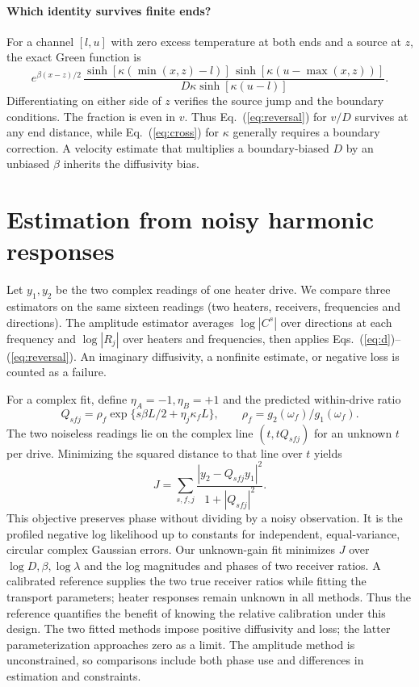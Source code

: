 \documentclass[11pt]{article}
\begin{document}
\paragraph{Which identity survives finite ends?}
For a channel $[l,u]$ with zero excess temperature at both ends and a source at $z$, the exact Green function is
\begin{equation}
 e^{\beta(x-z)/2}\,
 \frac{\sinh[\kappa(\min(x,z)-l)]\,\sinh[\kappa(u-\max(x,z))]}
 {D\kappa\sinh[\kappa(u-l)]}. \label{eq:finite}
\end{equation}
Differentiating on either side of $z$ verifies the source jump and the boundary conditions. The fraction is even in $v$. Thus Eq.~(\ref{eq:reversal}) for $v/D$ survives at any end distance, while Eq.~(\ref{eq:cross}) for $\kappa$ generally requires a boundary correction. A velocity estimate that multiplies a boundary-biased $D$ by an unbiased $\beta$ inherits the diffusivity bias.

\section{Estimation from noisy harmonic responses}
Let $y_1,y_2$ be the two complex readings of one heater drive. We compare three estimators on the same sixteen readings (two heaters, receivers, frequencies and directions). The amplitude estimator averages $\log |C^s|$ over directions at each frequency and $\log|R_j|$ over heaters and frequencies, then applies Eqs.~(\ref{eq:d})--(\ref{eq:reversal}). An imaginary diffusivity, a nonfinite estimate, or negative loss is counted as a failure.

For a complex fit, define $\eta_A=-1,\eta_B=+1$ and the predicted within-drive ratio
\[
 Q_{sfj}=\rho_f\exp\{s\beta L/2+\eta_j\kappa_f L\},\qquad \rho_f=g_2(\omega_f)/g_1(\omega_f).
\]
The two noiseless readings lie on the complex line $(t,tQ_{sfj})$ for an unknown $t$ per drive. Minimizing the squared distance to that line over $t$ yields
\begin{equation}
 J=\sum_{s,f,j}\frac{|y_2-Q_{sfj}y_1|^2}{1+|Q_{sfj}|^2}. \label{eq:profile}
\end{equation}
This objective preserves phase without dividing by a noisy observation. It is the profiled negative log likelihood up to constants for independent, equal-variance, circular complex Gaussian errors. Our unknown-gain fit minimizes $J$ over $\log D,\beta,\log\lambda$ and the log magnitudes and phases of two receiver ratios. A calibrated reference supplies the two true receiver ratios while fitting the transport parameters; heater responses remain unknown in all methods. Thus the reference quantifies the benefit of knowing the relative calibration under this design. The two fitted methods impose positive diffusivity and loss; the latter parameterization approaches zero as a limit. The amplitude method is unconstrained, so comparisons include both phase use and differences in estimation and constraints.
\end{document}
